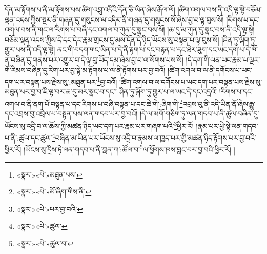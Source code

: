 དོན་མ་རྟོགས་པ་ནི་མ་རྟོགས་པས་ཚིག་འབྲུ་འདིའི་དོན་ཅི་ཡིན་ཞེས་རྒོལ་ལོ། །ཚིག་འགལ་བས་ནི་འདི་ལྟ་སྟེ་བཅོམ་ལྡན་འདས་ཀྱིས་སྔར་ནི་གཞན་དུ་གསུངས་ལ་འདིར་ནི་གཞན་དུ་གསུངས་སོ་ཞེས་བྱ་བ་ལྟ་བུས་སོ། །རིགས་པ་དང་འགལ་བས་ནི་གང་ལ་རིགས་པ་བཞི་དང་འགལ་བ་ཀུན་དུ་སྣང་བས་སོ། །ཆ་དུ་མ་ཀུན་དུ་སྣང་བས་ནི་འདི་ལྟ་སྟེ། བཅོམ་ལྡན་འདས་ཀྱིས་དེ་དང་དེར་རྣམ་གྲངས་དུ་མས་དོན་དེ་ཉིད་ཡོངས་སུ་བསྟན་པ་ལྟ་བུས་སོ། །ཤིན་ཏུ་ལྐོག་ཏུ་གྱུར་པས་ནི་འདི་ལྟ་སྟེ། ནང་གི་བདག་གང་ཡིན་པ་དེ་ནི་རྟག་པ་དང་བརྟན་པ་དང་ཐེར་ཟུག་དང་ཡང་དག་པ་དེ་ཁོ་ན་བཞིན་དུ་གནས་པར་འགྱུར་བ་དེ་ལྟ་བུ་ཡོད་དམ་ཞེས་བྱ་བ་ལ་སོགས་པས་སོ། །དེ་དག་གི་ལན་ཡང་རྣམ་པ་ལྔར་གོ་རིམས་བཞིན་དུ་རིག་པར་བྱ་སྟེ་མ་རྟོགས་པ་ལ་ནི་རྟོགས་པར་བྱ་བའོ། །ཚིག་འགལ་བ་ལ་ནི་དགོངས་པ་ཡང་དག་པར་བསྟན་པས་རྗེས་སུ་:མཐུན་པར་\footnote{«སྣར་»«པེ་»མཐུན་པས་}བྱ་བའོ། །ཚིག་འགལ་བ་ལ་དགོངས་པ་ཡང་དག་པར་བསྟན་པས་རྗེས་སུ་མཐུན་པར་བྱ་བ་ཇི་ལྟ་བར་ཆ་དུ་མར་སྣང་བ་དང་། ཤིན་ཏུ་ལྐོག་ཏུ་གྱུར་པ་ལ་ཡང་དེ་དང་འདྲའོ། །རིགས་པ་དང་འགལ་བ་ནི་ནག་པོ་བསྟན་པ་དང་རིགས་པ་བཞི་བསྟན་པ་དང་ཆེ་གེ་:ཞིག་གི་\footnote{«སྣར་»«པེ་»མོ་ཞིག་གིས་ནི་}འབྲས་བུ་ནི་འདི་ཡིན་ནོ་ཞེས་རྒྱུ་དང་འབྲས་བུ་འབྲེལ་པ་བསྟན་པས་ལན་གདབ་པར་བྱ་བའོ། །དེ་ལ་མགོ་གཅིག་ཏུ་ལན་གདབ་པ་ནི་ཚུལ་བཞིན་དུ་ཡོངས་སུ་འདྲི་བ་ལ་ཆོས་ཀྱི་མཚན་ཉིད་ཡང་དག་པར་རྣམ་པར་གཞག་པའི་\footnote{«སྣར་»«པེ་»པར་བྱ་བའི་}ཕྱིར་རོ། །རྣམ་པར་ཕྱེ་སྟེ་ལན་གདབ་པ་ནི་:ཚུལ་དང་ཚུལ་\footnote{«སྣར་»«པེ་»ཚུལ་}བཞིན་མ་ཡིན་པར་ཡོངས་སུ་འདྲི་བ་རྣམས་ལ་ཁྱད་པར་གྱི་མཚན་ཉིད་རྟོགས་པར་བྱ་བའི་ཕྱིར་རོ། །ཡོངས་སུ་དྲིས་ཏེ་ལན་གདབ་པ་ནི་ཀླན་ཀ་:ཚོལ་བ་\footnote{«སྣར་»«པེ་»ཚུལ་བ་}ལ་ཕྱོགས་ཁས་བླང་བར་བྱ་བའི་ཕྱིར་རོ། །
